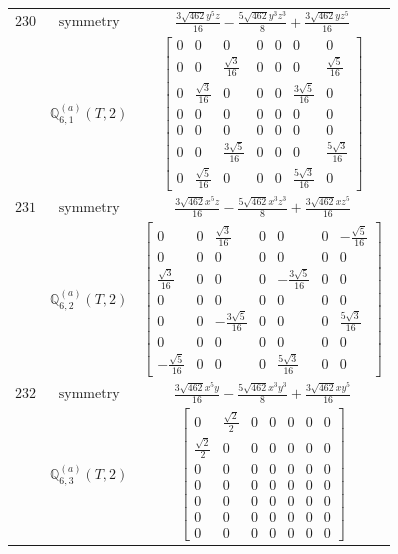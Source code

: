 \documentclass[fleqn,8pt,landscape]{jsarticle}
\begin{document}
\begin{longtable}{ccc}
$ 230 $ & $ \text{symmetry} $ & $ \frac{3 \sqrt{462} y^{5} z}{16} - \frac{5 \sqrt{462} y^{3} z^{3}}{8} + \frac{3 \sqrt{462} y z^{5}}{16} $ \\
$  $ & $ \mathbb{Q}_{6,1}^{(a)}(T,2) $ & $ \begin{bmatrix} 0 & 0 & 0 & 0 & 0 & 0 & 0 \\ 0 & 0 & \frac{\sqrt{3}}{16} & 0 & 0 & 0 & \frac{\sqrt{5}}{16} \\ 0 & \frac{\sqrt{3}}{16} & 0 & 0 & 0 & \frac{3 \sqrt{5}}{16} & 0 \\ 0 & 0 & 0 & 0 & 0 & 0 & 0 \\ 0 & 0 & 0 & 0 & 0 & 0 & 0 \\ 0 & 0 & \frac{3 \sqrt{5}}{16} & 0 & 0 & 0 & \frac{5 \sqrt{3}}{16} \\ 0 & \frac{\sqrt{5}}{16} & 0 & 0 & 0 & \frac{5 \sqrt{3}}{16} & 0 \end{bmatrix} $ \\ \hline
$ 231 $ & $ \text{symmetry} $ & $ \frac{3 \sqrt{462} x^{5} z}{16} - \frac{5 \sqrt{462} x^{3} z^{3}}{8} + \frac{3 \sqrt{462} x z^{5}}{16} $ \\
$  $ & $ \mathbb{Q}_{6,2}^{(a)}(T,2) $ & $ \begin{bmatrix} 0 & 0 & \frac{\sqrt{3}}{16} & 0 & 0 & 0 & - \frac{\sqrt{5}}{16} \\ 0 & 0 & 0 & 0 & 0 & 0 & 0 \\ \frac{\sqrt{3}}{16} & 0 & 0 & 0 & - \frac{3 \sqrt{5}}{16} & 0 & 0 \\ 0 & 0 & 0 & 0 & 0 & 0 & 0 \\ 0 & 0 & - \frac{3 \sqrt{5}}{16} & 0 & 0 & 0 & \frac{5 \sqrt{3}}{16} \\ 0 & 0 & 0 & 0 & 0 & 0 & 0 \\ - \frac{\sqrt{5}}{16} & 0 & 0 & 0 & \frac{5 \sqrt{3}}{16} & 0 & 0 \end{bmatrix} $ \\ \hline
$ 232 $ & $ \text{symmetry} $ & $ \frac{3 \sqrt{462} x^{5} y}{16} - \frac{5 \sqrt{462} x^{3} y^{3}}{8} + \frac{3 \sqrt{462} x y^{5}}{16} $ \\
$  $ & $ \mathbb{Q}_{6,3}^{(a)}(T,2) $ & $ \begin{bmatrix} 0 & \frac{\sqrt{2}}{2} & 0 & 0 & 0 & 0 & 0 \\ \frac{\sqrt{2}}{2} & 0 & 0 & 0 & 0 & 0 & 0 \\ 0 & 0 & 0 & 0 & 0 & 0 & 0 \\ 0 & 0 & 0 & 0 & 0 & 0 & 0 \\ 0 & 0 & 0 & 0 & 0 & 0 & 0 \\ 0 & 0 & 0 & 0 & 0 & 0 & 0 \\ 0 & 0 & 0 & 0 & 0 & 0 & 0 \end{bmatrix} $ \\ \hline

\end{longtable}
\end{document}
